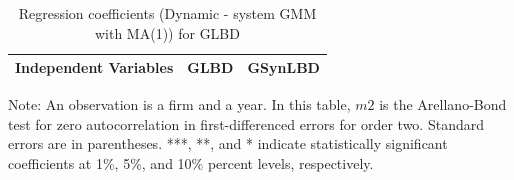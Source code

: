 \begin{table}[H]
  \centering
 \caption{Regression coefficients (Dynamic - system GMM with MA(1)) for GLBD} \label{tab:Dynamic - system GMM with MA(1)_ger} \medskip
\renewcommand{\arraystretch}{1}
\setlength{\tabcolsep}{14pt}
\begin{tabular}{l|c| c}
\toprule
\textbf{Independent Variables}&\textbf{GLBD} &\textbf{GSynLBD}\\
\midrule

   \bottomrule
  \end{tabular} 
\begin{tablenotes}
\small
\item Note: An observation is a firm and a year. In this table, $m2$ is the Arellano-Bond test for zero autocorrelation in first-differenced errors for order two. Standard errors are in parentheses. ***, **, and * indicate statistically significant coefficients at 1\%, 5\%, and 10\% percent levels, respectively.
 \end{tablenotes}
\end{table}








%
%

